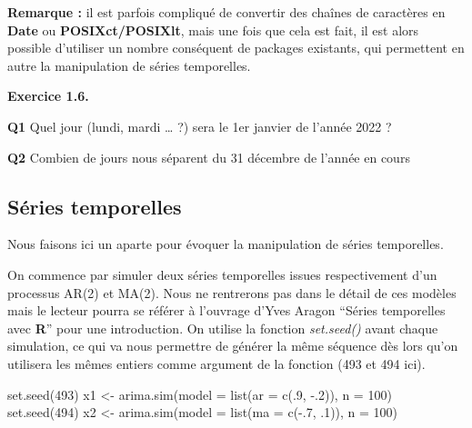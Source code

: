 \documentclass[
]{book}
\newenvironment{Shaded}{\begin{snugshade}}{\end{snugshade}}
\newcommand{\AttributeTok}[1]{\textcolor[rgb]{0.77,0.63,0.00}{#1}}
\newcommand{\DecValTok}[1]{\textcolor[rgb]{0.00,0.00,0.81}{#1}}
\newcommand{\FunctionTok}[1]{\textcolor[rgb]{0.00,0.00,0.00}{#1}}
\newcommand{\NormalTok}[1]{#1}
\newcommand{\OtherTok}[1]{\textcolor[rgb]{0.56,0.35,0.01}{#1}}
\newcommand{\SpecialCharTok}[1]{\textcolor[rgb]{0.00,0.00,0.00}{#1}}
\theoremstyle{definition}
\theoremstyle{definition}
\theoremstyle{definition}
\theoremstyle{definition}
\theoremstyle{remark}
\begin{document}
\textbf{Remarque :} il est parfois compliqué de convertir des chaînes de caractères en \textbf{Date} ou \textbf{POSIXct/POSIXlt}, mais une fois que cela est fait, il est alors possible d'utiliser un nombre conséquent de packages existants, qui permettent en autre la manipulation de séries temporelles.

\textbf{Exercice 1.6.}

\textbf{Q1} Quel jour (lundi, mardi \ldots{} ?) sera le 1er janvier de l'année 2022 ?

\textbf{Q2} Combien de jours nous séparent du 31 décembre de l'année en cours

\hypertarget{suxe9ries-temporelles}{%
\subsection{Séries temporelles}\label{suxe9ries-temporelles}}

Nous faisons ici un aparte pour évoquer la manipulation de séries temporelles.

On commence par simuler deux séries temporelles issues respectivement d'un processus AR(2) et MA(2). Nous ne rentrerons pas dans le détail de ces modèles mais le lecteur pourra se référer à l'ouvrage d'Yves Aragon ``Séries temporelles avec \textbf{R}'' pour une introduction. On utilise la fonction \emph{set.seed()} avant chaque simulation, ce qui va nous permettre de générer la même séquence dès lors qu'on utilisera les mêmes entiers comme argument de la fonction (493 et 494 ici).

\begin{Shaded}
\begin{Highlighting}[]
\FunctionTok{set.seed}\NormalTok{(}\DecValTok{493}\NormalTok{)}
\NormalTok{x1 }\OtherTok{\textless{}{-}} \FunctionTok{arima.sim}\NormalTok{(}\AttributeTok{model =} \FunctionTok{list}\NormalTok{(}\AttributeTok{ar =} \FunctionTok{c}\NormalTok{(.}\DecValTok{9}\NormalTok{, }\SpecialCharTok{{-}}\NormalTok{.}\DecValTok{2}\NormalTok{)), }\AttributeTok{n =} \DecValTok{100}\NormalTok{)}
\FunctionTok{set.seed}\NormalTok{(}\DecValTok{494}\NormalTok{)}
\NormalTok{x2 }\OtherTok{\textless{}{-}} \FunctionTok{arima.sim}\NormalTok{(}\AttributeTok{model =} \FunctionTok{list}\NormalTok{(}\AttributeTok{ma =} \FunctionTok{c}\NormalTok{(}\SpecialCharTok{{-}}\NormalTok{.}\DecValTok{7}\NormalTok{, .}\DecValTok{1}\NormalTok{)), }\AttributeTok{n =} \DecValTok{100}\NormalTok{)}
\end{Highlighting}
\end{Shaded}
\end{document}

